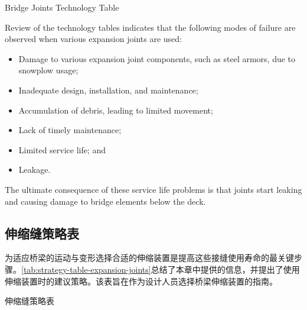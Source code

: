\begin{table}
  \caption{Bridge Joints Technology Table}
  \label{tab:bridge-joints-technology}
\end{table}

Review of the technology tables indicates that the following modes of failure are observed when various expansion joints are used:
\begin{itemize}
  \item Damage to various expansion joint components, such as steel armors, due to snowplow usage;
  \item Inadequate design, installation, and maintenance;
  \item Accumulation of debris, leading to limited movement;
  \item Lack of timely maintenance;
  \item Limited service life; and
  \item Leakage.
\end{itemize}

The ultimate consequence of these service life problems is that joints start leaking and causing damage to bridge elements below the deck.

\subsection{伸缩缝策略表}
为适应桥梁的运动与变形选择合适的伸缩装置是提高这些接缝使用寿命的最关键步骤。\cref{tab:strategy-table-expansion-joints}总结了本章中提供的信息，并提出了使用伸缩装置时的建议策略。该表旨在作为设计人员选择桥梁伸缩装置的指南。

\begin{table}
  \caption{伸缩缝策略表}
  \label{tab:strategy-table-expansion-joints}
\end{table}
